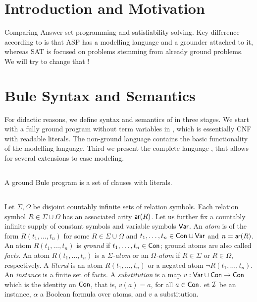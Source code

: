 \documentclass[conference]{IEEEtran}
\begin{document}
\tableofcontents
\section{Introduction and Motivation}

Comparing Answer set programming and satisfiability solving. Key difference
according to \cite{Lierler17} is that ASP has a modelling language and a
grounder attached to it, whereas SAT is focused on problems stemming from
already ground problems. We will try to change that !


\section{Bule Syntax and Semantics}

For didactic reasons, we define syntax and semantics of \bule in three stages. 
We start with a fully ground program without term variables in \bflat, which is essentially CNF with readable literals. 
The non-ground language \bcore contains the basic functionality of the modelling language. 
Third we present the complete language \bfull, that allows for several extensions to ease modeling. 

\subsection{\bflat}

A ground Bule program is a set of clauses with literals. 

\subsection{\bcore}

Let $\Sigma,\Omega$ be disjoint countably infinite sets of relation symbols.  
Each relation symbol $R\in \Sigma\cup\Omega$ has an associated arity $\mathsf{ar}(R)$.  
Let us further fix a countably infinite supply of constant symbols  and variable symbols $\mathsf{Var}$.  
An \emph{atom} is of the form $R(t_1,\ldots,t_n)$ for some $R\in \Sigma\cup\Omega$ and $t_1,\ldots,t_n\in\mathsf{Con}\cup\mathsf{Var}$ and $n=\mathsf{ar}(R)$. 
An atom $R(t_1,\ldots,t_n)$ is \emph{ground} if $t_1,\ldots,t_n\in\mathsf{Con}$; ground atoms are also called \emph{facts}. 
An atom $R(t_1,\ldots,t_n)$ is a \emph{$\Sigma$-atom} or an \emph{$\Omega$-atom} if $R\in \Sigma$ or $R\in \Omega$, respectively. 
A \emph{literal} is an atom $R(t_1,\ldots,t_n)$ or a negated atom $\neg R(t_1,\ldots,t_n)$. 
An \emph{instance} is a finite set of facts. A \emph{substitution} is a map $v:\mathsf{Var}\cup\mathsf{Con}\to\mathsf{Con}$ which is the identity on $\mathsf{Con}$, that is, $v(a)=a$, for all $a\in\mathsf{Con}$.
et $\mathcal{I}$ be an instance, $\alpha$ a Boolean formula over atoms, and $v$ a substitution. 
\end{document}
